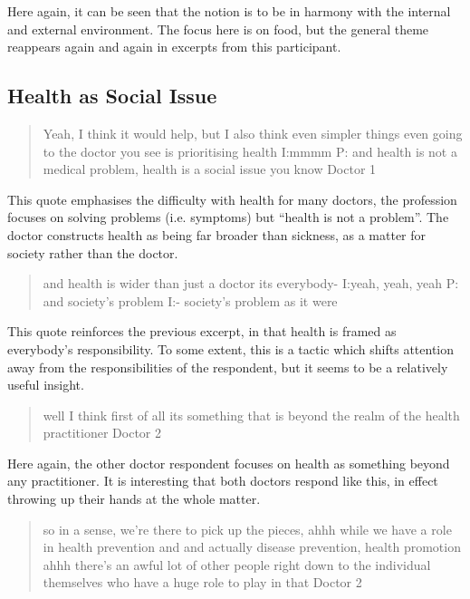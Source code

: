 Here again, it can be seen that the notion is to be in harmony with the internal and external environment. The focus here is on food, but the general theme reappears again and again in excerpts from this participant. 

\subsection{Health as Social Issue}
\label{sec:health-as-social}


\begin{quotation}
  Yeah, I think it would help, but I also think even simpler things even going to the doctor you see is prioritising health
I:mmmm
P: and health is not a medical problem, health is a social issue you know
Doctor 1
\end{quotation}

This quote emphasises the difficulty with health for many doctors, the profession focuses on solving problems (i.e. symptoms) but ``health is not a problem''. The doctor constructs health as being far broader than sickness, as a matter for society rather than the doctor. 

\begin{quotation}
  and health is wider than just a doctor its everybody-
I:yeah, yeah, yeah
P: and society's problem 
I:- society's problem as it were

\end{quotation}

This quote reinforces the previous excerpt, in that health is framed as everybody's responsibility. To some extent, this is a tactic which shifts attention away from the responsibilities of the respondent, but it seems to be a relatively useful insight. 

\begin{quotation}
  well I think first of all its something that is beyond the realm of the health practitioner 
Doctor 2
\end{quotation}

Here again, the other doctor respondent focuses on health as something beyond any practitioner. It is interesting that both doctors respond like this, in effect throwing up their hands at the whole matter. 

\begin{quotation}
  so in a sense, we're there to pick up the pieces, ahhh while we have a role in health prevention and and actually disease prevention, health promotion ahhh there's an awful lot of other people right down to the individual themselves who have a huge role to play in that
Doctor 2
\end{quotation}


